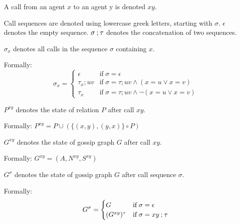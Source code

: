 \begin{definition}[Calls]
    \label{def:calls}
    A call from an agent \(x\) to an agent y is denoted \(xy\).

    \begin{subdefinition}
        \label{def:call-sequence}
        Call sequences are denoted using lowercase greek letters, starting with \(\sigma\). \(\epsilon\) denotes the empty sequence. \(\sigma \mathbin{;} \tau\) denotes the concatenation of two sequences.
    \end{subdefinition}
    
    \begin{subdefinition}[Subsequence]
        \(\sigma_x\) denotes all calls in the sequence \(\sigma\) containing \(x\).

        Formally:
        \[
            \sigma_x = 
            \begin{cases} 
                \epsilon            & \text{if}\; \sigma = \epsilon\\
                \tau_x\mathbin{;}uv & \text{if}\; \sigma = \tau\mathbin{;}uv \land (x = u \lor x = v) \\ 
                \tau_x              & \text{if}\; \sigma = \tau\mathbin{;}uv \land \lnot(x = u \lor x = v) 
            \end{cases}
        \]
    \end{subdefinition}

    \begin{subdefinition}
        \label{def:call-effect-relation}
        \(P^{xy}\) denotes the state of relation \(P\) after call \(xy\).

        Formally: \( P^{xy} = P \cup (\{(x,y),(y,x)\} \circ P) \)
    \end{subdefinition}

    \begin{subdefinition}
        \label{def:call-effect-graph}
        \(G^{xy}\) denotes the state of gossip graph \(G\) after call \(xy\).

        Formally: \( G^{xy} = (A,N^{xy},S^{xy}) \)
    \end{subdefinition}

    \begin{subdefinition}
        \(G^\sigma\) denotes the state of gossip graph \(G\) after call sequence \(\sigma\).

        Formally: 
        \[ 
            G^\sigma = 
            \begin{cases}
                G               & \text{if}\; \sigma = \epsilon\\
                (G^{xy})^\tau   & \text{if}\; \sigma = xy \mathbin{;} \tau
            \end{cases}
        \]
    \end{subdefinition}


\end{definition}
